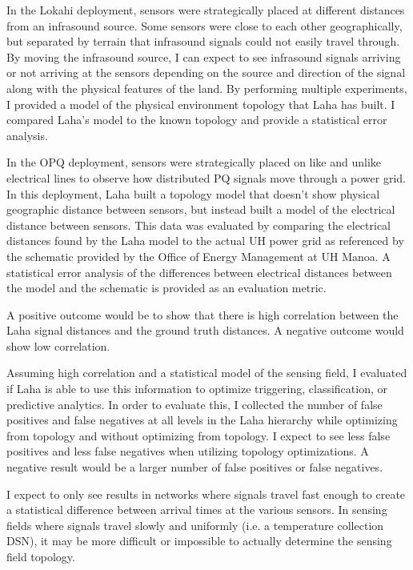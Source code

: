 In the Lokahi deployment, sensors were strategically placed at different distances from an infrasound source. Some sensors were close to each other geographically, but separated by terrain that infrasound signals could not easily travel through. By moving the infrasound source, I can expect to see infrasound signals arriving or not arriving at the sensors depending on the source and direction of the signal along with the physical features of the land. By performing multiple experiments, I provided a model of the physical environment topology that Laha has built. I compared Laha's model to the known topology and provide a statistical error analysis. 

In the OPQ deployment, sensors were strategically placed on like and unlike electrical lines to observe how distributed PQ signals move through a power grid. In this deployment, Laha built a topology model that doesn't show physical geographic distance between sensors, but instead built a model of the electrical distance between sensors. This data was evaluated by comparing the electrical distances found by the Laha model to the actual UH power grid as referenced by the schematic provided by the Office of Energy Management at UH Manoa. A statistical error analysis of the differences between electrical distances between the model and the schematic is provided as an evaluation metric.

A positive outcome would be to show that there is high correlation between the Laha signal distances and the ground truth distances. A negative outcome would show low correlation.

Assuming high correlation and a statistical model of the sensing field, I evaluated if Laha is able to use this information to optimize triggering, classification, or predictive analytics. In order to evaluate this, I collected the number of false positives and false negatives at all levels in the Laha hierarchy while optimizing from topology and without optimizing from topology. I expect to see less false positives and less false negatives when utilizing topology optimizations. A negative result would be a larger number of false positives or false negatives.

I expect to only see results in networks where signals travel fast enough to create a statistical difference between arrival times at the various sensors. In sensing fields where signals travel slowly and uniformly (i.e. a temperature collection DSN), it may be more difficult or impossible to actually determine the sensing field topology.
